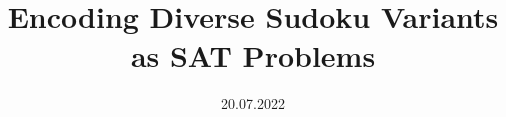 \documentclass[a4paper, 10pt, oneside]{memoir}
\title				{Encoding Diverse Sudoku Variants as SAT Problems}
\date				{20.07.2022}
\begin{document}

\thesisfront
\maketitle
\pagestyle{thesis}


\thesistoc
\thesismain






%
\thesisappendix
\thesisbib
\begin{appendices}
\end{appendices}
\thesisback
{}
  {}
  {}
\end{document}
